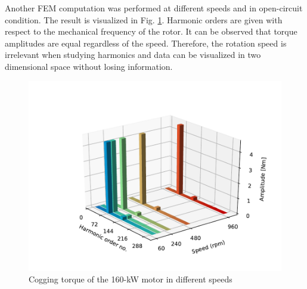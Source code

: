Another FEM computation was performed at different speeds and in open-circuit condition. The result is visualized in Fig. \ref{FEM_orders}. Harmonic orders are given with respect to the mechanical frequency of the rotor. It can be observed that torque amplitudes are equal regardless of the speed. Therefore, the rotation speed is irrelevant when studying harmonics and data can be visualized in two dimensional space without losing information.
\begin{figure}[htb] 
    \centering
    \includegraphics[width=1.0\linewidth]{images/cogging-different-speeds.pdf} 
    \caption{Cogging torque of the 160-kW motor in different speeds}
    \label{FEM_orders}
\end{figure}


